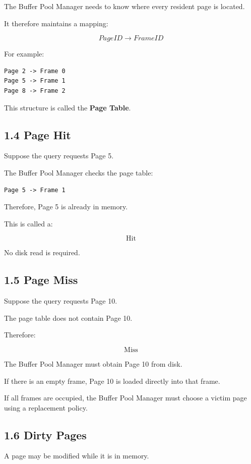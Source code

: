 \documentclass[12pt,a4paper]{article}
\begin{document}
The Buffer Pool Manager needs to know where every resident page is located.

It therefore maintains a mapping:

\[
PageID \rightarrow FrameID
\]

For example:

\begin{verbatim}
Page 2 -> Frame 0
Page 5 -> Frame 1
Page 8 -> Frame 2
\end{verbatim}

This structure is called the \textbf{Page Table}.

\subsection{1.4 Page Hit}

Suppose the query requests Page 5.

The Buffer Pool Manager checks the page table:

\begin{verbatim}
Page 5 -> Frame 1
\end{verbatim}

Therefore, Page 5 is already in memory.

This is called a:

\[
\boxed{\text{Hit}}
\]

No disk read is required.

\subsection{1.5 Page Miss}

Suppose the query requests Page 10.

The page table does not contain Page 10.

Therefore:

\[
\boxed{\text{Miss}}
\]

The Buffer Pool Manager must obtain Page 10 from disk.

If there is an empty frame, Page 10 is loaded directly into that frame.

If all frames are occupied, the Buffer Pool Manager must choose a victim page using a replacement policy.

\subsection{1.6 Dirty Pages}

A page may be modified while it is in memory.
\end{document}
